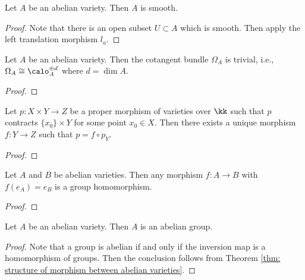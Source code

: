     \begin{proposition}\label{prop: abelian varieties are smooth}
        Let \( A \) be an abelian variety. 
        Then \( A \) is smooth.
    \end{proposition}
    \begin{proof}
        Note that there is an open subset \(U\subset A\) which is smooth.
        Then apply the left translation morphism \(l_a\).
    \end{proof}

    \begin{proposition}\label{prop: abelian varieties have trivial cotangent bundle}
        Let \( A \) be an abelian variety.
        Then the cotangent bundle \( \Omega_A \) is trivial, i.e., \(\Omega_A \cong \calo_A^{\oplus d}\) where \(d = \dim A\).
    \end{proposition}
    \begin{proof}
    \end{proof}

    \begin{lemma}\label{lem: rigidity lemma for X product type}
        Let \(p: X \times Y \to Z\) be a proper morphism of varieties over \(\kk\) such that \(p\) contracts \(\{x_0\} \times Y\) for some point \(x_0 \in X\).
        Then there exists a unique morphism \(f: Y \to Z\) such that \(p = f \circ p_Y\).
    \end{lemma}
    \begin{proof}
    \end{proof}

    \begin{theorem}\label{thm: structure of morphism between abelian varieties}
        Let \(A\) and \(B\) be abelian varieties. 
        Then any morphism \(f: A \to B\) with \(f(e_A) = e_B\) is a group homomorphism.
    \end{theorem}
    \begin{proof}
    \end{proof}

    \begin{proposition}\label{prop: abelian varieties are abelian groups}
        Let \( A \) be an abelian variety. 
        Then \( A \) is an abelian group.
    \end{proposition}
    \begin{proof}
        Note that a group is abelian if and only if the inversion map is a homomorphism of groups.
        Then the conclusion follows from Theorem \ref{thm: structure of morphism between abelian varieties}.
    \end{proof}

